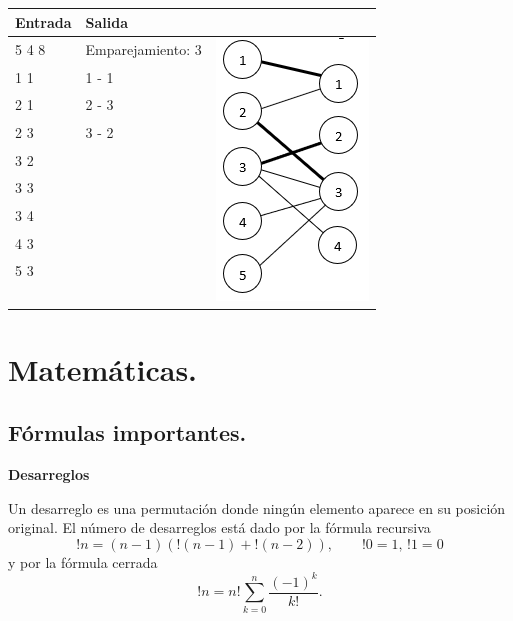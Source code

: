 \documentclass[10pt, letterpaper, twoside]{article}
\begin{document}
\begin{tabular}{|p{4cm}|p{4cm}|p{7.5cm}|}
\hline
\textbf{Entrada} & \textbf{Salida} & \\ \hline
5 4 8 & Emparejamiento: 3 & \multirow{13}{*}{\includegraphics[height = 0.24\textheight]{Grafos/Imagenes/MaxMatching.png}} \\
1 1   & 1 - 1 & \\
2 1   & 2 - 3 & \\
2 3   & 3 - 2 & \\
3 2   & & \\
3 3   & & \\
3 4   & & \\
4 3   & & \\
5 3   & & \\ 
 & & \\
 & & \\
 & & \\ 
 & & \\\hline
\end{tabular}

\newpage

\section{Matemáticas.}

\subsection{Fórmulas importantes.}

\textbf{Desarreglos}

Un desarreglo es una permutación donde ningún elemento aparece en su posición original. El número de desarreglos está dado por la fórmula recursiva 
$$!n = (n - 1)(!(n - 1) + !(n - 2)), \qquad !0 = 1, \, !1 = 0$$ 
y por la fórmula cerrada
$$!n = n! \sum_{k=0}^n \frac{(-1)^k}{k!}.$$
\end{document}
